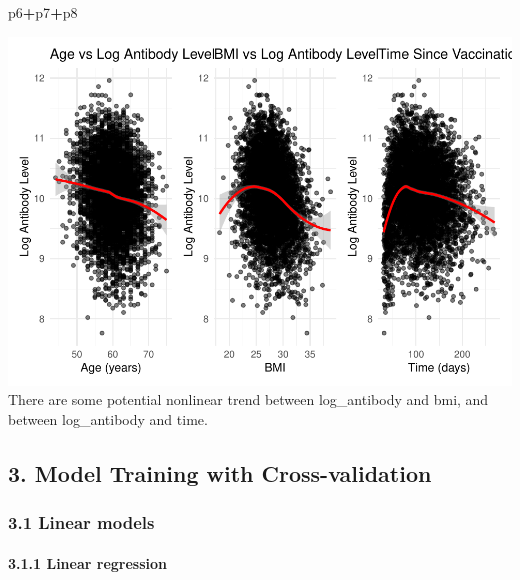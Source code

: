 \documentclass[
]{article}
\newenvironment{Shaded}{\begin{snugshade}}{\end{snugshade}}
\newcommand{\NormalTok}[1]{#1}
\newcommand{\SpecialCharTok}[1]{\textcolor[rgb]{0.81,0.36,0.00}{\textbf{#1}}}
\begin{document}
\begin{Shaded}
\begin{Highlighting}[]
\NormalTok{p6}\SpecialCharTok{+}\NormalTok{p7}\SpecialCharTok{+}\NormalTok{p8}
\end{Highlighting}
\end{Shaded}

\includegraphics{p8106_midterm_project_files/figure-latex/unnamed-chunk-14-1.pdf}
There are some potential nonlinear trend between log\_antibody and bmi,
and between log\_antibody and time.

\subsection{3. Model Training with
Cross-validation}\label{model-training-with-cross-validation}

\subsubsection{3.1 Linear models}\label{linear-models}

\paragraph{3.1.1 Linear regression}\label{linear-regression}
\end{document}
